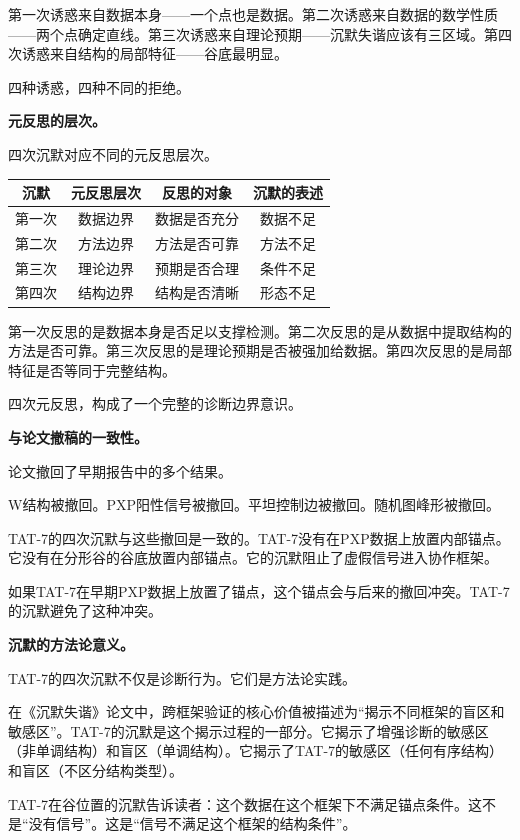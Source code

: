 \documentclass[11pt,a4paper]{book}
\theoremstyle{definition}
\begin{document}
第一次诱惑来自数据本身——一个点也是数据。第二次诱惑来自数据的数学性质——两个点确定直线。第三次诱惑来自理论预期——沉默失谐应该有三区域。第四次诱惑来自结构的局部特征——谷底最明显。

四种诱惑，四种不同的拒绝。

\textbf{元反思的层次。}

四次沉默对应不同的元反思层次。

\begin{table}[h]
\centering
\begin{tabular}{cccc}
\toprule
沉默 & 元反思层次 & 反思的对象 & 沉默的表述 \\
\midrule
第一次 & 数据边界 & 数据是否充分 & 数据不足 \\
第二次 & 方法边界 & 方法是否可靠 & 方法不足 \\
第三次 & 理论边界 & 预期是否合理 & 条件不足 \\
第四次 & 结构边界 & 结构是否清晰 & 形态不足 \\
\bottomrule
\end{tabular}
\end{table}

第一次反思的是数据本身是否足以支撑检测。第二次反思的是从数据中提取结构的方法是否可靠。第三次反思的是理论预期是否被强加给数据。第四次反思的是局部特征是否等同于完整结构。

四次元反思，构成了一个完整的诊断边界意识。

\textbf{与论文撤稿的一致性。}

论文撤回了早期报告中的多个结果。

W结构被撤回。PXP阳性信号被撤回。平坦控制边被撤回。随机图峰形被撤回。

TAT-7的四次沉默与这些撤回是一致的。TAT-7没有在PXP数据上放置内部锚点。它没有在分形谷的谷底放置内部锚点。它的沉默阻止了虚假信号进入协作框架。

如果TAT-7在早期PXP数据上放置了锚点，这个锚点会与后来的撤回冲突。TAT-7的沉默避免了这种冲突。

\textbf{沉默的方法论意义。}

TAT-7的四次沉默不仅是诊断行为。它们是方法论实践。

在《沉默失谐》论文中，跨框架验证的核心价值被描述为“揭示不同框架的盲区和敏感区”。TAT-7的沉默是这个揭示过程的一部分。它揭示了增强诊断的敏感区（非单调结构）和盲区（单调结构）。它揭示了TAT-7的敏感区（任何有序结构）和盲区（不区分结构类型）。

TAT-7在谷位置的沉默告诉读者：这个数据在这个框架下不满足锚点条件。这不是“没有信号”。这是“信号不满足这个框架的结构条件”。
\end{document}
